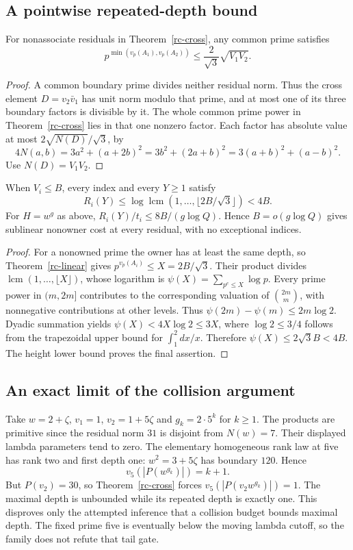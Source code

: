\subsection{A pointwise repeated-depth bound}
\begin{theorem}\label{rc-linear}
For nonassociate residuals in Theorem~\ref{rc-cross}, any common prime satisfies
\[
 p^{\min(v_p(A_1),v_p(A_2))}\le\frac2{\sqrt3}\sqrt{V_1V_2}.
\]
\end{theorem}
\begin{proof}
A common boundary prime divides neither residual norm. Thus the cross element
$D=v_2\bar v_1$ has unit norm modulo that prime, and at most one of its three
boundary factors is divisible by it. The whole common prime power in
Theorem~\ref{rc-cross} lies in that one nonzero factor.
Each factor has absolute value at most $2\sqrt{N(D)}/\sqrt3$, by
\[
 4N(a,b)=3a^2+(a+2b)^2=3b^2+(2a+b)^2
       =3(a+b)^2+(a-b)^2.
\]
Use $N(D)=V_1V_2$.
\end{proof}

\begin{theorem}\label{rc-pointwise}
When $V_i\le B$, every index and every $Y\ge1$ satisfy
\[
 R_i(Y)\le\log\operatorname{lcm}(1,\ldots,\lfloor2B/\sqrt3\rfloor)<4B.
\]
For $H=w^g$ as above, $R_i(Y)/t_i\le8B/(g\log Q)$. Hence
$B=o(g\log Q)$ gives sublinear nonowner cost at every residual, with no
exceptional indices.
\end{theorem}
\begin{proof}
For a nonowned prime the owner has at least the same depth, so
Theorem~\ref{rc-linear} gives $p^{v_p(A_i)}\le X=2B/\sqrt3$.
Their product divides $\operatorname{lcm}(1,\ldots,\lfloor X\rfloor)$,
whose logarithm is $\psi(X)=\sum_{p^e\le X}\log p$.
Every prime power in $(m,2m]$ contributes to the corresponding valuation of
$\binom{2m}{m}$, with nonnegative contributions at other levels. Thus
$\psi(2m)-\psi(m)\le2m\log2$. Dyadic summation yields
$\psi(X)<4X\log2\le3X$, where $\log2\le3/4$ follows from the trapezoidal
upper bound for $\int_1^2dx/x$. Therefore $\psi(X)\le2\sqrt3B<4B$.
The height lower bound proves the final assertion.
\end{proof}

\subsection{An exact limit of the collision argument}
Take $w=2+\zeta$, $v_1=1$, $v_2=1+5\zeta$ and $g_k=2\cdot5^k$ for
$k\ge1$. The products are primitive since the residual norm $31$ is disjoint
from $N(w)=7$. Their displayed lambda parameters tend to zero. The elementary
homogeneous rank law at five has rank two and first depth one:
$w^2=3+5\zeta$ has boundary $120$. Hence
\[
 v_5(|P(w^{g_k})|)=k+1.
\]
But $P(v_2)=30$, so Theorem~\ref{rc-cross} forces
$v_5(|P(v_2w^{g_k})|)=1$. The maximal depth is unbounded while its repeated
depth is exactly one. This disproves only the attempted inference that a
collision budget bounds maximal depth. The fixed prime five is eventually
below the moving lambda cutoff, so the family does not refute that tail gate.

